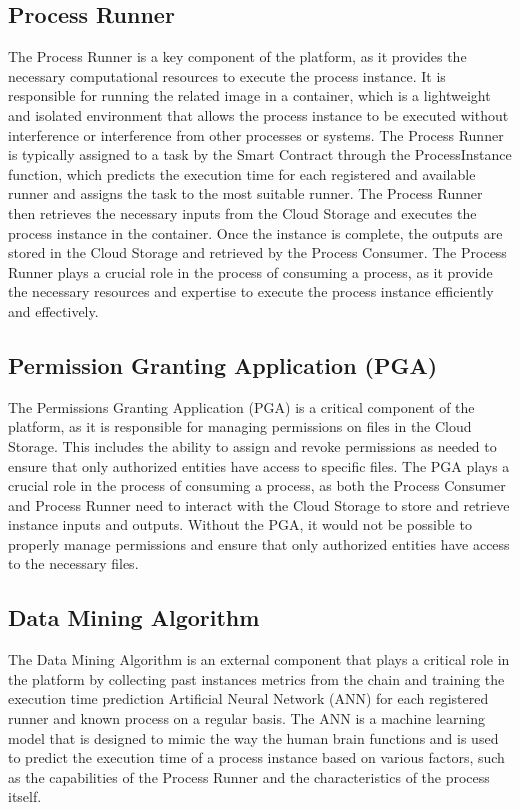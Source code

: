 \documentclass[10pt,a4paper]{report}
\begin{document}
\subsection{Process Runner}
\large\justify The Process Runner is a key component of the platform, as it provides the necessary computational resources to execute the process instance. It is responsible for running the related image in a container, which is a lightweight and isolated environment that allows the process instance to be executed without interference or interference from other processes or systems. The Process Runner is typically assigned to a task by the Smart Contract through the ProcessInstance function, which predicts the execution time for each registered and available runner and assigns the task to the most suitable runner. The Process Runner then retrieves the necessary inputs from the Cloud Storage and executes the process instance in the container. Once the instance is complete, the outputs are stored in the Cloud Storage and retrieved by the Process Consumer. The Process Runner plays a crucial role in the process of consuming a process, as it provide the necessary resources and expertise to execute the process instance efficiently and effectively.

\subsection{Permission Granting Application (PGA)}
\large\justify The Permissions Granting Application (PGA) is a critical component of the platform, as it is responsible for managing permissions on files in the Cloud Storage. This includes the ability to assign and revoke permissions as needed to ensure that only authorized entities have access to specific files. The PGA plays a crucial role in the process of consuming a process, as both the Process Consumer and Process Runner need to interact with the Cloud Storage to store and retrieve instance inputs and outputs. Without the PGA, it would not be possible to properly manage permissions and ensure that only authorized entities have access to the necessary files.

\subsection{Data Mining Algorithm}
\large\justify The Data Mining Algorithm is an external component that plays a critical role in the platform by collecting past instances metrics from the chain and training the execution time prediction Artificial Neural Network (ANN) for each registered runner and known process on a regular basis. The ANN is a machine learning model that is designed to mimic the way the human brain functions and is used to predict the execution time of a process instance based on various factors, such as the capabilities of the Process Runner and the characteristics of the process itself.
\end{document}
